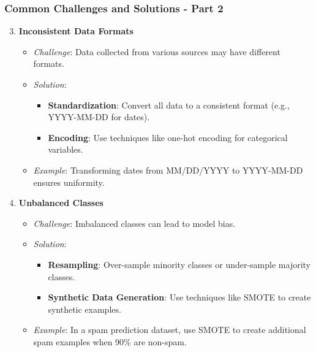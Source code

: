 \documentclass[aspectratio=169]{beamer}
\begin{document}
\begin{frame}[fragile]
    \frametitle{Common Challenges and Solutions - Part 2}
    \begin{enumerate}
        \setcounter{enumi}{2} %
        \item \textbf{Inconsistent Data Formats}
            \begin{itemize}
                \item \textit{Challenge}: Data collected from various sources may have different formats.
                \item \textit{Solution}:
                    \begin{itemize}
                        \item \textbf{Standardization}: Convert all data to a consistent format (e.g., YYYY-MM-DD for dates).
                        \item \textbf{Encoding}: Use techniques like one-hot encoding for categorical variables.
                    \end{itemize}
                \item \textit{Example}: Transforming dates from MM/DD/YYYY to YYYY-MM-DD ensures uniformity.
            \end{itemize}

        \item \textbf{Unbalanced Classes}
            \begin{itemize}
                \item \textit{Challenge}: Imbalanced classes can lead to model bias.
                \item \textit{Solution}:
                    \begin{itemize}
                        \item \textbf{Resampling}: Over-sample minority classes or under-sample majority classes.
                        \item \textbf{Synthetic Data Generation}: Use techniques like SMOTE to create synthetic examples.
                    \end{itemize}
                \item \textit{Example}: In a spam prediction dataset, use SMOTE to create additional spam examples when 90\% are non-spam.
            \end{itemize}
    \end{enumerate}
\end{frame}
\end{document}
